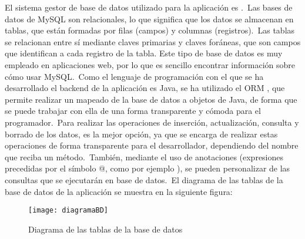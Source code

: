 
El sistema gestor de base de datos utilizado para la aplicación es .\ Las bases de datos de MySQL son
relacionales, lo que significa que los datos se almacenan en tablas, que están formadas por filas (campos) y columnas
(registros).\ Las tablas se relacionan entre sí mediante claves primarias y claves foráneas, que son campos que
identifican a cada registro de la tabla.
Este tipo de base de datos es muy empleado en aplicaciones web, por lo que es sencillo encontrar información sobre
cómo usar MySQL\@.\ Como el lenguaje de programación con el que se ha desarrollado el backend de la aplicación es
Java, se ha utilizado el ORM , que permite realizar un mapeado de la base de datos a objetos de
Java, de forma que se puede trabajar con ella de una forma transparente y cómoda para el programador.\ Para realizar
las operaciones de inserción, actualización, consulta y borrado de los datos,  es la
mejor opción, ya que se encarga de realizar estas operaciones de forma transparente para el desarrollador,
dependiendo del nombre que reciba un método.\ También, mediante el uso de anotaciones (expresiones precedidas por el
símbolo @, como por ejemplo ), se pueden personalizar de las consultas que se ejecutarán en base de
datos.\ El diagrama de las tablas de la base de datos de la aplicación se muestra en la siguiente figura:

\begin{figure}[H]
	\centering
	\texttt{[image: diagramaBD]}
	\caption{Diagrama de las tablas de la base de datos}
	\label{fig:diagrama-tablas}
\end{figure}
